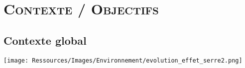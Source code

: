 \documentclass[xcolor=x11names, compress, 11pt]{beamer}
\begin{document}










\section{\scshape Contexte / Objectifs}
\subsection{Contexte global}
\begin{frame}[c]
    \vfill
    \centering
    \texttt{[image: Ressources/Images/Environnement/evolution\_effet\_serre2.png]}
    \vfill
    \vfill
\end{frame}




\end{document}
